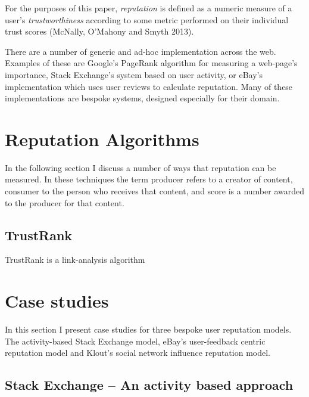 \documentclass[]{final_report}
\begin{document}
For the purposes of this paper, \textsl{reputation} is defined as a numeric measure of a user's \textsl{trustworthiness} according to some metric performed on their individual trust scores (McNally, O'Mahony and Smyth 2013).

There are a number of generic and ad-hoc implementation across the web. Examples of these are Google's PageRank algorithm for measuring a web-page's importance, Stack Exchange's system based on user activity, or eBay's implementation which uses user reviews to calculate reputation. Many of these implementations are bespoke systems, designed especially for their domain.


\section{Reputation Algorithms}
In the following section I discuss a number of ways that reputation can be measured. In these techniques the term producer refers to a creator of content, consumer to the person who receives that content, and score is a number awarded to the producer for that content.


\subsection{TrustRank}
TrustRank is a link-analysis algorithm 

\section{Case studies}

In this section I present case studies for three bespoke user reputation models. The activity-based Stack Exchange model, eBay's user-feedback centric reputation model and Klout's social network influence reputation model.

\subsection{Stack Exchange -- An activity based approach}
\end{document}
